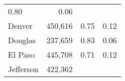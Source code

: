 \documentclass[12pt,twoside]{reedthesis}
\begin{document}
\begin{longtable}[]{@{}lrlr@{}}
\begin{minipage}[t]{0.30\columnwidth}
  0.80\strut
  \end{minipage} & \begin{minipage}[t]{0.26\columnwidth}\raggedleft\strut
  0.06\strut
  \end{minipage}\tabularnewline
  \begin{minipage}[t]{0.10\columnwidth}\raggedright\strut
  Denver\strut
  \end{minipage} & \begin{minipage}[t]{0.23\columnwidth}\raggedleft\strut
  450,616\strut
  \end{minipage} & \begin{minipage}[t]{0.30\columnwidth}\raggedright\strut
  0.75\strut
  \end{minipage} & \begin{minipage}[t]{0.26\columnwidth}\raggedleft\strut
  0.12\strut
  \end{minipage}\tabularnewline
  \begin{minipage}[t]{0.10\columnwidth}\raggedright\strut
  Douglas\strut
  \end{minipage} & \begin{minipage}[t]{0.23\columnwidth}\raggedleft\strut
  237,659\strut
  \end{minipage} & \begin{minipage}[t]{0.30\columnwidth}\raggedright\strut
  0.83\strut
  \end{minipage} & \begin{minipage}[t]{0.26\columnwidth}\raggedleft\strut
  0.06\strut
  \end{minipage}\tabularnewline
  \begin{minipage}[t]{0.10\columnwidth}\raggedright\strut
  El Paso\strut
  \end{minipage} & \begin{minipage}[t]{0.23\columnwidth}\raggedleft\strut
  445,708\strut
  \end{minipage} & \begin{minipage}[t]{0.30\columnwidth}\raggedright\strut
  0.71\strut
  \end{minipage} & \begin{minipage}[t]{0.26\columnwidth}\raggedleft\strut
  0.12\strut
  \end{minipage}\tabularnewline
  \begin{minipage}[t]{0.10\columnwidth}\raggedright\strut
  Jefferson\strut
  \end{minipage} & \begin{minipage}[t]{0.23\columnwidth}\raggedleft\strut
  422,362\strut

\end{minipage}
\end{longtable}
\end{document}
